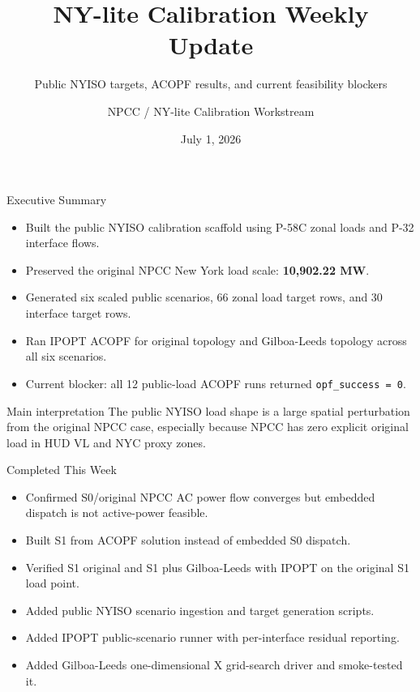 \documentclass[aspectratio=169,10pt]{beamer}
\title[NY-lite Calibration]{NY-lite Calibration Weekly Update}
\subtitle{Public NYISO targets, ACOPF results, and current feasibility blockers}
\author{NPCC / NY-lite Calibration Workstream}
\date{July 1, 2026}
\newcommand{\bad}[1]{\textcolor{alertred}{#1}}
\begin{document}
\begin{frame}
  \titlepage
\end{frame}

\begin{frame}{Executive Summary}
\begin{itemize}
  \item Built the public NYISO calibration scaffold using P-58C zonal loads and P-32 interface flows.
  \item Preserved the original NPCC New York load scale: \textbf{10,902.22 MW}.
  \item Generated six scaled public scenarios, 66 zonal load target rows, and 30 interface target rows.
  \item Ran IPOPT ACOPF for original topology and Gilboa-Leeds topology across all six scenarios.
  \item Current blocker: \bad{all 12 public-load ACOPF runs returned \texttt{opf\_success = 0}}.
\end{itemize}

\vspace{0.5em}
\begin{block}{Main interpretation}
The public NYISO load shape is a large spatial perturbation from the original NPCC case, especially because NPCC has zero explicit original load in HUD VL and NYC proxy zones.
\end{block}
\end{frame}

\begin{frame}{Completed This Week}
\begin{itemize}
  \item Confirmed S0/original NPCC AC power flow converges but embedded dispatch is not active-power feasible.
  \item Built S1 from ACOPF solution instead of embedded S0 dispatch.
  \item Verified S1 original and S1 plus Gilboa-Leeds with IPOPT on the original S1 load point.
  \item Added public NYISO scenario ingestion and target generation scripts.
  \item Added IPOPT public-scenario runner with per-interface residual reporting.
  \item Added Gilboa-Leeds one-dimensional X grid-search driver and smoke-tested it.
\end{itemize}
\end{frame}
\end{document}
